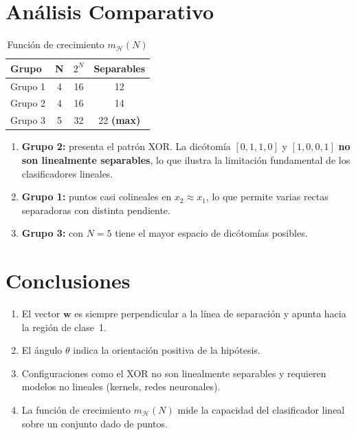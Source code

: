 \documentclass[12pt,a4paper]{article}
\begin{document}
\section{An\'alisis Comparativo}
\begin{table}[H]\centering
  \caption{Funci\'on de crecimiento $m_{\mathcal{H}}(N)$}
  \begin{tabular}{lccc}\toprule
    \textbf{Grupo} & \textbf{N} & \textbf{$2^N$} & \textbf{Separables}\\\midrule
    Grupo 1 & 4 & 16 & 12 \\
    Grupo 2 & 4 & 16 & 14 \\
    Grupo 3 & 5 & 32 & 22 \textbf{(max)} \\
  \bottomrule\end{tabular}
\end{table}

\begin{enumerate}
  \item \textbf{Grupo 2:} presenta el patr\'on XOR. La dic\'otom\'ia $[0,1,1,0]$
        y $[1,0,0,1]$ \textbf{no son linealmente separables}, lo que ilustra
        la limitaci\'on fundamental de los clasificadores lineales.
  \item \textbf{Grupo 1:} puntos casi colineales en $x_2 \approx x_1$,
        lo que permite varias rectas separadoras con distinta pendiente.
  \item \textbf{Grupo 3:} con $N=5$ tiene el mayor espacio de dic\'otom\'ias posibles.
\end{enumerate}

\section{Conclusiones}
\begin{enumerate}
  \item El vector $\mathbf{w}$ es siempre perpendicular a la l\'inea de separaci\'on
        y apunta hacia la regi\'on de clase~1.
  \item El \'angulo $\theta$ indica la orientaci\'on positiva de la hip\'otesis.
  \item Configuraciones como el XOR no son linealmente separables y
        requieren modelos no lineales (kernels, redes neuronales).
  \item La funci\'on de crecimiento $m_{\mathcal{H}}(N)$ mide la capacidad
        del clasificador lineal sobre un conjunto dado de puntos.
\end{enumerate}
\end{document}
